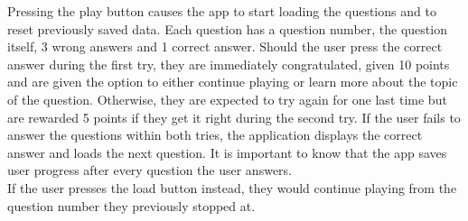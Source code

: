 \documentclass[paper=a4,fontsize=11pt]{article}
\begin{document}
\noindent
Pressing the play button causes the app to start loading the questions and to reset previously saved data.
Each question has a question number, the question itself, 3 wrong answers and 1 correct answer.
Should the user press the correct answer during the first try, they are immediately
congratulated, given 10 points and are given the option to either continue playing
or learn more about the topic of the question. Otherwise, they are expected to try
again for one last time but are rewarded 5 points if they get it right during the
second try. If the user fails to answer the questions within both tries, the application
displays the correct answer and loads the next question. It is important to know
that the app saves user progress after every question the user answers.\\

\noindent
If the user presses the load button instead, they would continue playing from the question
number they previously stopped at.\\\\
\end{document}
